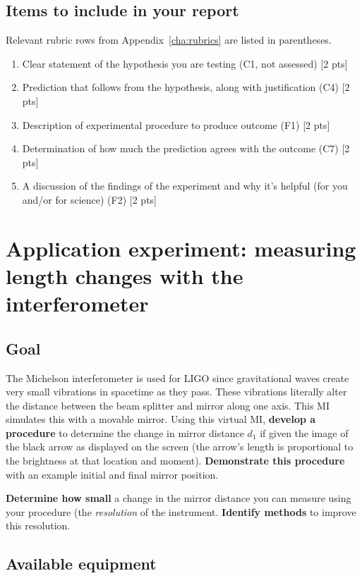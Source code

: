 \subsection{Items to include in your report}

Relevant rubric rows from Appendix~\ref{cha:rubrics} are listed in parentheses.

\begin{enumerate}
	\item Clear statement of the hypothesis you are testing (C1, not assessed) [2 pts]
	\item Prediction that follows from the hypothesis, along with justification (C4) [2 pts]
	\item Description of experimental procedure to produce outcome (F1) [2 pts]
	\item Determination of how much the prediction agrees with the outcome (C7) [2 pts]
	\item A discussion of the findings of the experiment and why it's helpful (for you and/or for science) (F2) [2 pts]
\end{enumerate}

\section{Application experiment: measuring length changes with the interferometer}

\subsection{Goal}

The Michelson interferometer is used for LIGO since gravitational waves create very small vibrations in spacetime as they pass. These vibrations literally alter the distance between the beam splitter and mirror along one axis. This MI simulates this with a movable mirror. Using this virtual MI, \textbf{develop a procedure} to determine the change in mirror distance $d_1$ if given the image of the black arrow as displayed on the screen (the arrow's length is proportional to the brightness at that location and moment). \textbf{Demonstrate this procedure} with an example initial and final mirror position.

\textbf{Determine how small} a change in the mirror distance you can measure using your procedure (the \textit{resolution} of the instrument. \textbf{Identify methods} to improve this resolution. 

\subsection{Available equipment}

